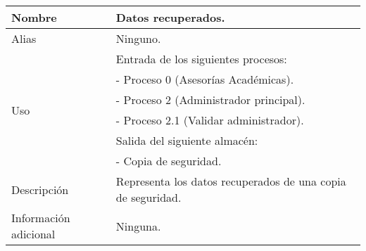 \begin{center}
  \begin{tabular}{| l | p{9cm} |}
    \hline
    Nombre & \textbf{Datos recuperados}.\\
    \hline
    Alias & Ninguno.\\
    \hline
    \multirow{6}{*}{Uso} & Entrada de los siguientes procesos:\\
                         & - Proceso 0 (Asesorías Académicas).\\
                         & - Proceso 2 (Administrador principal).\\
                         & - Proceso 2.1 (Validar administrador).\\
                         & Salida del siguiente almacén:\\
                         & - Copia de seguridad.\\
    \hline
    Descripción & Representa los datos recuperados de una copia de seguridad.
\\
    \hline
    Información adicional & Ninguna.\\
    \hline
  \end{tabular}
\end{center}
